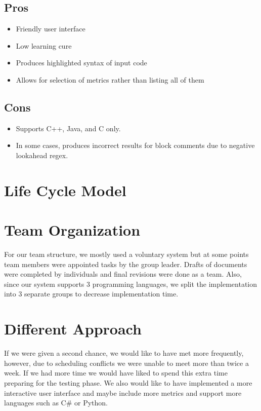 \documentclass{scrreprt}
\begin{document}
	\section{Pros}
	\begin{itemize}
		\item Friendly user interface
		\item Low learning cure
		\item Produces highlighted syntax of input code
		\item Allows for selection of metrics rather than listing all of them
	\end{itemize}

	\section{Cons}
	\begin{itemize}
		\item Supports C++, Java, and C only.
		\item In some cases, produces incorrect results for block comments due to negative lookahead regex.
	\end{itemize}

	{\let\clearpage\relax\pagebreak \chapter{Life Cycle Model}}
	

	{\let\clearpage\relax \chapter{Team Organization}}
	For our team structure, we mostly used a voluntary system but at some points team members were appointed tasks by the group leader. Drafts of documents were completed by individuals and final revisions were done as a team. Also, since our system supports 3 programming languages, we split the implementation into 3 separate groups to decrease implementation time.
	
	

	{\let\clearpage\relax \chapter{Different Approach}}
	If we were given a second chance, we would like to have met more frequently, however, due to scheduling conflicts we were unable to meet more than twice a week. If we had more time we would have liked to spend this extra time preparing for the testing phase. We also would like to have implemented a more interactive user interface and maybe include more metrics and support more languages such as C\# or Python.
\end{document}
